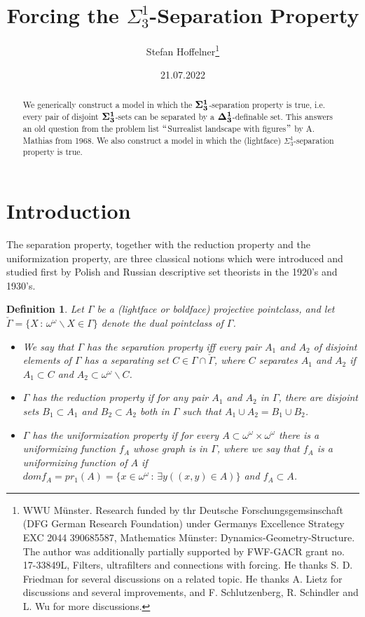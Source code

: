 \documentclass[a4paper,11pt]{article}
\title{Forcing the ${\Sigma^1_3}$-Separation Property}
\author{ Stefan Hoffelner\footnote{ WWU M\"unster. Research funded by thr Deutsche Forschungsgemsinschaft (DFG German Research Foundation) under Germanys Excellence Strategy EXC 2044 390685587, Mathematics M\"unster: Dynamics-Geometry-Structure. The author was additionally partially supported by FWF-GACR grant no. 17-33849L, Filters, ultrafilters and connections with forcing. He thanks S. D. Friedman for several discussions on a related topic. He thanks A. Lietz for discussions and several improvements, and F. Schlutzenberg, R. Schindler and L. Wu for more discussions. }}
\date{21.07.2022}
\newtheorem{definition}[theorem]{Definition}
\begin{document}
\maketitle

\begin{abstract}
We generically construct a model in which the $\bf{\Sigma^1_3}$-separation property is true, i.e. every pair of disjoint $\bf{\Sigma^1_3}$-sets can be separated by a $\bf{\Delta^1_3}$-definable set. This answers an old question from the problem list $``$Surrealist landscape with figures$"$  by A. Mathias from 1968. We also construct a model in which the (lightface) $\Sigma^1_3$-separation property is true. 
\end{abstract}

\section{Introduction}

The separation property, together with the reduction property and the uniformization property, are three classical notions which were introduced and studied first by Polish and Russian descriptive set theorists in the 1920's and 1930's.


\begin{definition} Let $\Gamma$ be a (lightface or boldface) projective pointclass, and let $\check{\Gamma}=\{X \, : \, \omega^{\omega} \backslash X \in \Gamma \}$ denote the dual pointclass of $\Gamma$.
\begin{itemize}

\item  We say that  $\Gamma$ has the separation 
 property iff every pair $A_1$ and $A_2$ of disjoint elements of $\Gamma$ has a separating set $C  \in \Gamma \cap \check{\Gamma}$, where $C$ separates $A_1$ and $A_2$ if $A_1 \subset C$ and $A_2 \subset \omega^{\omega} \backslash C$.
\item  $\Gamma$ has the reduction property if for any pair $A_1$ and $A_2$ in $\Gamma$, there are disjoint sets $B_1 \subset A_1$ and $B_2 \subset A_2$ both in $\Gamma$ such that $A_1 \cup A_2= B_1 \cup B_2$.
\item $\Gamma$ has the uniformization property if  for every $A \subset \omega^{\omega} \times \omega^{\omega}$ there is a uniformizing function $f_A$ whose graph is in $\Gamma$, where we say that $f_A$ is a uniformizing function of $A$ if
$dom f_A = pr_1(A)=\{ x \in \omega^{\omega} \, : \, \exists y ((x,y) \in A) \}$ and $f_A \subset A$.
\end{itemize}

\end{definition}
\end{document}
